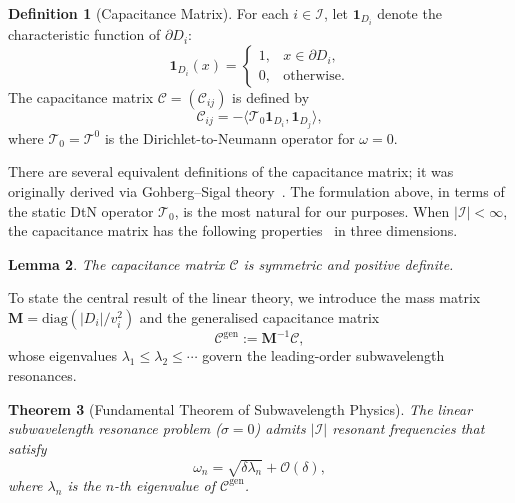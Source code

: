 \documentclass[a4paper,reqno,twoside]{amsart}
\numberwithin{equation}{section}
\newtheorem{theorem}{Theorem}[section]
\newtheorem{lemma}[theorem]{Lemma}
\theoremstyle{definition}
\newtheorem{definition}[theorem]{Definition}
\newtheorem{remark}[theorem]{Remark}
\newcommand{\<}{\ensuremath \leq}
\renewcommand{\>}{\ensuremath \geq}
\begin{document}
\begin{definition}[Capacitance Matrix]
    For each $i \in \mathcal{I}$, let $\mathbf{1}_{D_i}$ denote the characteristic function of $\partial D_i$:
    \begin{equation}
        \mathbf{1}_{D_i}(x) =
        \begin{cases}
            1, & x \in \partial D_i,\\
            0, & \text{otherwise}.
        \end{cases}
    \end{equation}
    The capacitance matrix $\mathcal{C} = (\mathcal{C}_{ij})$ is defined by
    \begin{equation}
        \mathcal{C}_{ij} = -\langle \mathcal{T}_0 \mathbf{1}_{D_i}, \mathbf{1}_{D_j}\rangle,
    \end{equation}
    where $\mathcal{T}_0 = \mathcal{T^0}$ is the Dirichlet-to-Neumann operator for $\omega=0$.
\end{definition}

There are several equivalent definitions of the capacitance matrix; it was originally derived via Gohberg--Sigal theory~\cite{ammariMinnaert2018, ammari.davies.ea2024Functional}. The formulation above, in terms of the static DtN operator $\mathcal{T}_0$, is the most natural for our purposes.
When $\lvert \mathcal{I}\rvert <\infty$, the capacitance matrix has the following properties~\cite{ammari.davies.ea2024Functional} in three dimensions.

\begin{lemma}\label{lem:cap_properties}
    The capacitance matrix $\mathcal{C}$ is symmetric and positive definite.
\end{lemma}

To state the central result of the linear theory, we introduce the mass matrix $\mathbf{M} = \mathrm{diag}\!\left(\lvert D_i\rvert / v_i^2\right)$ and the generalised capacitance matrix
\begin{equation}
    \mathcal{C}^{\mathrm{gen}} := \mathbf{M}^{-1}\mathcal{C},
\end{equation}
whose eigenvalues $\lambda_1 \leq \lambda_2 \leq \cdots$ govern the leading-order subwavelength resonances.

\begin{theorem}[Fundamental Theorem of Subwavelength Physics]\label{thm:fundamental}
    The linear subwavelength resonance problem ($\sigma = 0$)  admits $\lvert \mathcal{I}\rvert$ resonant frequencies that satisfy
    \begin{equation}
        \omega_n = \sqrt{\delta\lambda_n} + \mathcal{O}(\delta),
    \end{equation}
    where $\lambda_n$ is the $n$-th eigenvalue of $\mathcal{C}^{\mathrm{gen}}$.
\end{theorem}
\end{document}
